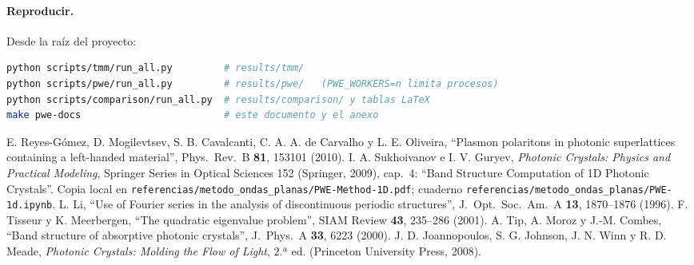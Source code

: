 \documentclass[11pt,a4paper]{article}
\newcommand{\code}[1]{\texttt{#1}}
\begin{document}
\paragraph{Reproducir.} Desde la raíz del proyecto:
\begin{lstlisting}[language=bash]
python scripts/tmm/run_all.py         # results/tmm/
python scripts/pwe/run_all.py         # results/pwe/   (PWE_WORKERS=n limita procesos)
python scripts/comparison/run_all.py  # results/comparison/ y tablas LaTeX
make pwe-docs                         # este documento y el anexo
\end{lstlisting}

\begin{thebibliography}{9}
 E. Reyes-Gómez, D. Mogilevtsev, S. B. Cavalcanti, C. A. A. de
Carvalho y L. E. Oliveira, ``Plasmon polaritons in photonic superlattices
containing a left-handed material'', Phys.\ Rev.\ B \textbf{81}, 153101 (2010).
 I. A. Sukhoivanov e I. V. Guryev, \textit{Photonic
Crystals: Physics and Practical Modeling}, Springer Series in Optical Sciences
152 (Springer, 2009), cap.~4: ``Band Structure Computation of 1D Photonic
Crystals''. Copia local en \code{referencias/metodo\_ondas\_planas/PWE-Method-1D.pdf}; cuaderno
\code{referencias/metodo\_ondas\_planas/PWE-1d.ipynb}.
 L. Li, ``Use of Fourier series in the analysis of
discontinuous periodic structures'', J.\ Opt.\ Soc.\ Am.\ A \textbf{13},
1870--1876 (1996).
 F. Tisseur y K. Meerbergen, ``The quadratic eigenvalue
problem'', SIAM Review \textbf{43}, 235--286 (2001).
 A. Tip, A. Moroz y J.-M. Combes, ``Band structure of absorptive
photonic crystals'', J.\ Phys.\ A \textbf{33}, 6223 (2000).
 J. D. Joannopoulos, S. G. Johnson, J. N. Winn y R. D.
Meade, \textit{Photonic Crystals: Molding the Flow of Light}, 2.ª ed.
(Princeton University Press, 2008).
\end{thebibliography}
\end{document}

